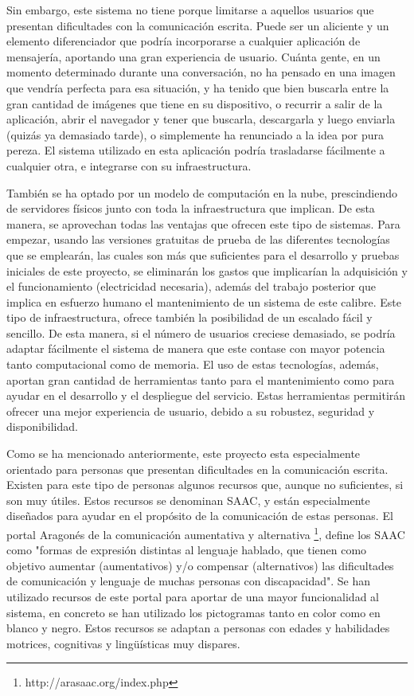 Sin embargo, este sistema no tiene porque limitarse a aquellos usuarios que presentan dificultades con la comunicación escrita. Puede ser un aliciente y un elemento diferenciador que podría incorporarse a cualquier aplicación de mensajería, aportando una gran experiencia de usuario. Cuánta gente, en un momento determinado durante una conversación, no ha pensado en una imagen que vendría perfecta para esa situación, y ha tenido que bien buscarla entre la gran cantidad de imágenes que tiene en su dispositivo, o recurrir a salir de la aplicación, abrir el navegador y tener que buscarla, descargarla y luego enviarla (quizás ya demasiado tarde), o simplemente ha renunciado a la idea por pura pereza. El sistema utilizado en esta aplicación podría trasladarse fácilmente a cualquier otra, e integrarse con su infraestructura.

También se ha optado por un modelo de computación en la nube, prescindiendo de servidores físicos junto con toda la infraestructura que implican. De esta manera, se aprovechan todas las ventajas que ofrecen este tipo de sistemas. Para empezar, usando las versiones gratuitas de prueba de las diferentes tecnologías que se emplearán, las cuales son más que suficientes para el desarrollo y pruebas iniciales de este proyecto, se eliminarán los gastos que implicarían la adquisición y el funcionamiento (electricidad necesaria), además del trabajo posterior que implica en esfuerzo humano el mantenimiento de un sistema de este calibre. Este tipo de infraestructura, ofrece también la posibilidad de un escalado fácil y sencillo. De esta manera, si el número de usuarios creciese demasiado, se podría adaptar fácilmente el sistema de manera que este contase con mayor potencia tanto computacional como de memoria. El uso de estas tecnologías, además, aportan gran cantidad de herramientas tanto para el mantenimiento como para ayudar en el desarrollo y el despliegue del servicio. Estas herramientas permitirán ofrecer una mejor experiencia de usuario, debido a su robustez, seguridad y disponibilidad.


Como se ha mencionado anteriormente, este proyecto esta especialmente orientado para personas que presentan dificultades en la comunicación escrita. Existen para este tipo de personas algunos recursos que, aunque no suficientes, si son muy útiles. Estos recursos se denominan \ac{SAAC}, y están especialmente diseñados para ayudar en el propósito de la comunicación de estas personas. El portal Aragonés de la comunicación aumentativa y alternativa \footnote{http://arasaac.org/index.php}, define los \ac{SAAC} como "formas de expresión distintas al lenguaje hablado, que tienen como objetivo aumentar (aumentativos) y/o compensar (alternativos) las dificultades de comunicación y lenguaje de muchas personas con discapacidad". Se han utilizado recursos de este portal para aportar de una mayor funcionalidad al sistema, en concreto se han utilizado los pictogramas tanto en color como en blanco y negro. Estos recursos se adaptan a personas con edades y habilidades motrices, cognitivas y lingüísticas muy dispares. 

